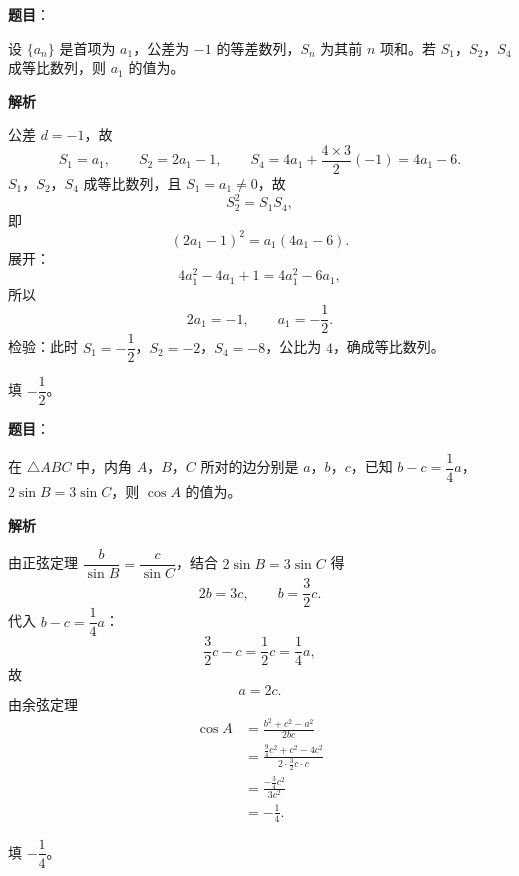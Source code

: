 \begin{answer}

\textbf{题目}：

设 $\{a_n\}$ 是首项为 $a_1$，公差为 $-1$ 的等差数列，$S_n$ 为其前 $n$ 项和。若 $S_1$，$S_2$，$S_4$ 成等比数列，则 $a_1$ 的值为\gkblank{}。

\textbf{解析}

公差 $d=-1$，故
\nopagebreak[4]
\[S_1=a_1,\qquad S_2=2a_1-1,\qquad S_4=4a_1+\frac{4\times3}{2}(-1)=4a_1-6.\]
$S_1$，$S_2$，$S_4$ 成等比数列，且 $S_1=a_1\ne0$，故
\nopagebreak[4]
\[S_2^2=S_1S_4,\]
即
\nopagebreak[4]
\[(2a_1-1)^2=a_1(4a_1-6).\]
展开：
\nopagebreak[4]
\[4a_1^2-4a_1+1=4a_1^2-6a_1,\]
所以
\nopagebreak[4]
\[2a_1=-1,\qquad a_1=-\frac12.\]
检验：此时 $S_1=-\dfrac12$，$S_2=-2$，$S_4=-8$，公比为 $4$，确成等比数列。

填 $-\dfrac12$。


\end{answer}
\begin{answer}

\textbf{题目}：

在 $\triangle ABC$ 中，内角 $A$，$B$，$C$ 所对的边分别是 $a$，$b$，$c$，已知 $b-c=\dfrac14a$，$2\sin B=3\sin C$，则 $\cos A$ 的值为\gkblank{}。

\textbf{解析}

由正弦定理 $\dfrac{b}{\sin B}=\dfrac{c}{\sin C}$，结合 $2\sin B=3\sin C$ 得
\nopagebreak[4]
\[2b=3c,\qquad b=\frac32c.\]
代入 $b-c=\dfrac14a$：
\nopagebreak[4]
\[\frac32c-c=\frac12c=\frac14a,\]
故
\nopagebreak[4]
\[a=2c.\]
由余弦定理
\nopagebreak[4]
\[\begin{aligned}
\cos A&=\frac{b^2+c^2-a^2}{2bc}\\
&=\frac{\frac94c^2+c^2-4c^2}{2\cdot\frac32c\cdot c}\\
&=\frac{-\frac34c^2}{3c^2}\\
&=-\frac14.
\end{aligned}\]

填 $-\dfrac14$。


\end{answer}
